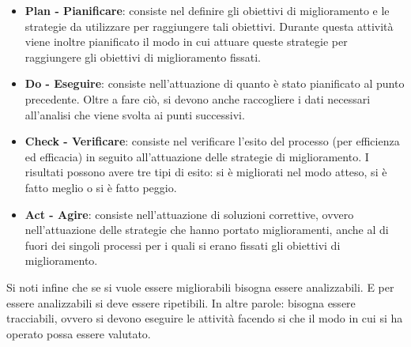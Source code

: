 \begin{itemize}
	\item \textbf{Plan - Pianificare}: consiste nel definire gli obiettivi di miglioramento e le strategie da utilizzare per raggiungere tali obiettivi. Durante questa attività viene inoltre pianificato il modo in cui attuare queste strategie per raggiungere gli obiettivi di miglioramento fissati.
	\item \textbf{Do - Eseguire}: consiste nell'attuazione di quanto è stato pianificato al punto precedente. Oltre a fare ciò, si devono anche raccogliere i dati necessari all'analisi che viene svolta ai punti successivi.
	\item \textbf{Check - Verificare}: consiste nel verificare l'esito del processo (per efficienza ed efficacia) in seguito all'attuazione delle strategie di miglioramento. I risultati possono avere tre tipi di esito: si è migliorati nel modo atteso, si è fatto meglio o si è fatto peggio. 
	\item \textbf{Act - Agire}: consiste nell'attuazione di soluzioni correttive, ovvero nell'attuazione delle strategie che hanno portato miglioramenti, anche al di fuori dei singoli processi per i quali si erano fissati gli obiettivi di miglioramento.
\end{itemize}
Si noti infine che se si vuole essere migliorabili bisogna essere analizzabili. E per essere analizzabili si deve essere ripetibili. In altre parole: bisogna essere tracciabili, ovvero si devono eseguire le attività facendo si che il modo in cui si ha operato possa essere valutato.
